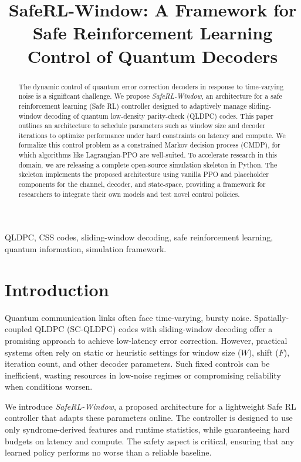 \documentclass[conference]{IEEEtran}
\title{SafeRL-Window: A Framework for Safe Reinforcement Learning Control of Quantum Decoders}
\author{
\IEEEauthorblockN{Agentic Research Group}
}
\begin{document}
\maketitle

\begin{abstract}
The dynamic control of quantum error correction decoders in response to time-varying noise is a significant challenge. We propose \emph{SafeRL-Window}, an architecture for a safe reinforcement learning (Safe RL) controller designed to adaptively manage sliding-window decoding of quantum low-density parity-check (QLDPC) codes. This paper outlines an architecture to schedule parameters such as window size and decoder iterations to optimize performance under hard constraints on latency and compute. We formalize this control problem as a constrained Markov decision process (CMDP), for which algorithms like Lagrangian-PPO are well-suited. To accelerate research in this domain, we are releasing a complete open-source simulation skeleton in Python. The skeleton implements the proposed architecture using vanilla PPO and placeholder components for the channel, decoder, and state-space, providing a framework for researchers to integrate their own models and test novel control policies.
\end{abstract}

\begin{IEEEkeywords}
QLDPC, CSS codes, sliding-window decoding, safe reinforcement learning, quantum information, simulation framework.
\end{IEEEkeywords}

\section{Introduction}
Quantum communication links often face time-varying, bursty noise. Spatially-coupled QLDPC (SC-QLDPC) codes with sliding-window decoding offer a promising approach to achieve low-latency error correction. However, practical systems often rely on static or heuristic settings for window size ($W$), shift ($F$), iteration count, and other decoder parameters. Such fixed controls can be inefficient, wasting resources in low-noise regimes or compromising reliability when conditions worsen.

We introduce \emph{SafeRL-Window}, a proposed architecture for a lightweight Safe RL controller that adapts these parameters online. The controller is designed to use only syndrome-derived features and runtime statistics, while guaranteeing hard budgets on latency and compute. The safety aspect is critical, ensuring that any learned policy performs no worse than a reliable baseline.
\end{document}
